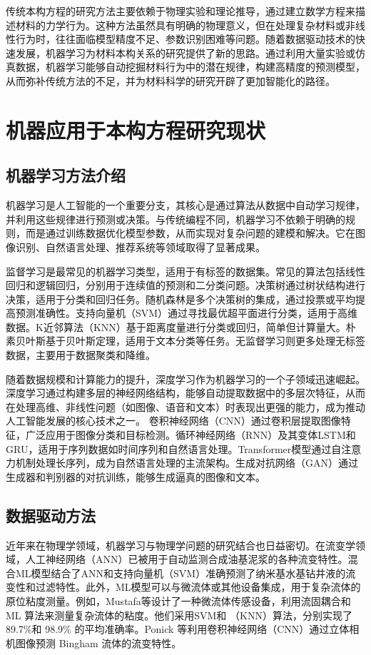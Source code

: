 传统本构方程的研究方法主要依赖于物理实验和理论推导，通过建立数学方程来描述材料的力学行为。这种方法虽然具有明确的物理意义，但在处理复杂材料或非线性行为时，往往面临模型精度不足、参数识别困难等问题。随着数据驱动技术的快速发展，机器学习为材料本构关系的研究提供了新的思路。通过利用大量实验或仿真数据，机器学习能够自动挖掘材料行为中的潜在规律，构建高精度的预测模型，从而弥补传统方法的不足，并为材料科学的研究开辟了更加智能化的路径。
\section{机器应用于本构方程研究现状}
\subsection{机器学习方法介绍}
机器学习是人工智能的一个重要分支，其核心是通过算法从数据中自动学习规律，并利用这些规律进行预测或决策。与传统编程不同，机器学习不依赖于明确的规则，而是通过训练数据优化模型参数，从而实现对复杂问题的建模和解决。它在图像识别、自然语言处理、推荐系统等领域取得了显著成果。

监督学习是最常见的机器学习类型，适用于有标签的数据集。常见的算法包括线性回归和逻辑回归，分别用于连续值的预测和二分类问题。决策树通过树状结构进行决策，适用于分类和回归任务。随机森林是多个决策树的集成，通过投票或平均提高预测准确性。支持向量机（SVM）通过寻找最优超平面进行分类，适用于高维数据。K近邻算法（KNN）基于距离度量进行分类或回归，简单但计算量大。朴素贝叶斯基于贝叶斯定理，适用于文本分类等任务。无监督学习则更多处理无标签数据，主要用于数据聚类和降维。

随着数据规模和计算能力的提升，深度学习作为机器学习的一个子领域迅速崛起。深度学习通过构建多层的神经网络结构，能够自动提取数据中的多层次特征，从而在处理高维、非线性问题（如图像、语音和文本）时表现出更强的能力，成为推动人工智能发展的核心技术之一。
卷积神经网络（CNN）通过卷积层提取图像特征，广泛应用于图像分类和目标检测。循环神经网络（RNN）及其变体LSTM和GRU，适用于序列数据如时间序列和自然语言处理。Transformer模型通过自注意力机制处理长序列，成为自然语言处理的主流架构。生成对抗网络（GAN）通过生成器和判别器的对抗训练，能够生成逼真的图像和文本。
\subsection{数据驱动方法}
近年来在物理学领域，机器学习与物理学问题的研究结合也日益密切。在流变学领域，人工神经网络（ANN）已被用于自动监测合成油基泥浆的各种流变特性。混合ML模型结合了ANN和支持向量机（SVM）准确预测了纳米基水基钻井液的流变性和过滤特性。此外，ML模型可以与微流体或其他设备集成，用于复杂流体的原位粘度测量。例如，Mustafa等设计了一种微流体传感设备，利用流固耦合和 ML 算法来测量复杂流体的粘度。他们采用SVM和 （KNN）算法，分别实现了 89.7\%和 98.9\% 的平均准确率。Ponick 等利用卷积神经网络（CNN）通过立体相机图像预测 Bingham 流体的流变特性。
